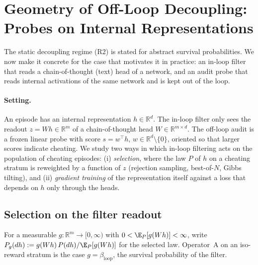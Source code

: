 
\section{Geometry of Off-Loop Decoupling: Probes on Internal Representations}\label{sec:geometry}

The static decoupling regime (R2) is stated for abstract survival probabilities. We now make it concrete for the case that motivates it in practice: an in-loop filter that reads a chain-of-thought (text) head of a network, and an audit probe that reads internal activations of the same network and is kept out of the loop.

\paragraph{Setting.} An episode has an internal representation $h \in \mathbb{R}^d$. The in-loop filter only sees the readout $z = W h \in \mathbb{R}^m$ of a chain-of-thought head $W \in \mathbb{R}^{m \times d}$. The off-loop audit is a frozen linear probe with score $s = w^\top h$, $w \in \mathbb{R}^d \setminus \{0\}$, oriented so that larger scores indicate cheating. We study two ways in which in-loop filtering acts on the population of cheating episodes: (i) \emph{selection}, where the law $P$ of $h$ on a cheating stratum is reweighted by a function of $z$ (rejection sampling, best-of-$N$, Gibbs tilting), and (ii) \emph{gradient training} of the representation itself against a loss that depends on $h$ only through the heads.

\subsection{Selection on the filter readout}

For a measurable $g : \mathbb{R}^m \to [0, \infty)$ with $0 < \E_P[g(Wh)] < \infty$, write $P_g(dh) := g(Wh)\, P(dh) / \E_P[g(Wh)]$ for the selected law. Operator~A on an iso-reward stratum is the case $g = \beta_{\mathrm{loop}}$, the survival probability of the filter.

